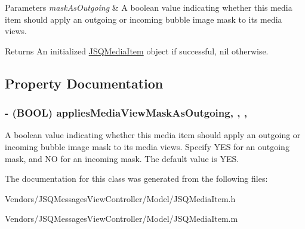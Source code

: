 \begin{DoxyParams}{Parameters}
{\em mask\+As\+Outgoing} & A boolean value indicating whether this media item should apply an outgoing or incoming bubble image mask to its media views.\\
\hline
\end{DoxyParams}
\begin{DoxyReturn}{Returns}
An initialized {\ttfamily \hyperlink{interface_j_s_q_media_item}{J\+S\+Q\+Media\+Item}} object if successful, {\ttfamily nil} otherwise. 
\end{DoxyReturn}


\subsection{Property Documentation}
\hypertarget{interface_j_s_q_media_item_a1fdf831927e6290df2fdceb724ec8046}{}
\subsubsection[{applies\+Media\+View\+Mask\+As\+Outgoing}]{\setlength{\rightskip}{0pt plus 5cm}-\/ (B\+O\+O\+L) applies\+Media\+View\+Mask\+As\+Outgoing\hspace{0.3cm}{\ttfamily [read]}, {\ttfamily [write]}, {\ttfamily [nonatomic]}, {\ttfamily [assign]}}\label{interface_j_s_q_media_item_a1fdf831927e6290df2fdceb724ec8046}
A boolean value indicating whether this media item should apply an outgoing or incoming bubble image mask to its media views. Specify {\ttfamily Y\+E\+S} for an outgoing mask, and {\ttfamily N\+O} for an incoming mask. The default value is {\ttfamily Y\+E\+S}. 

The documentation for this class was generated from the following files\+:\begin{DoxyCompactItemize}
\item 
Vendors/\+J\+S\+Q\+Messages\+View\+Controller/\+Model/J\+S\+Q\+Media\+Item.\+h\item 
Vendors/\+J\+S\+Q\+Messages\+View\+Controller/\+Model/J\+S\+Q\+Media\+Item.\+m\end{DoxyCompactItemize}
